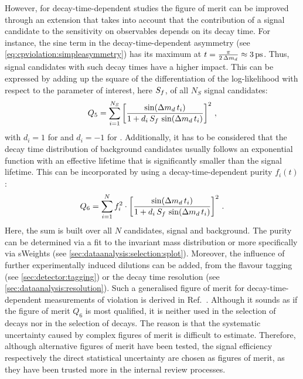 However, for decay-time-dependent studies the figure of merit can be improved
through an extension that takes into account that the contribution of a signal
candidate to the sensitivity on \CP observables depends on its decay time. For
instance, the sine term in the decay-time-dependent asymmetry (see
\cref{eq:cpviolation:simpleasymmetry}) has its maximum at $t =
\frac{\pi}{2\,\dmd} \approx \SI{3}{\ps}$. Thus, signal candidates with such
decay times have a higher impact. This can be expressed by adding up the
square of the differentiation of the log-likelihood with respect to the
parameter of interest, here $S_{f}$, of all $N_S$ signal candidates:
\begin{align}
	Q_5 = \sum_{i=1}^{N_S} \left[\frac{\sin({\Delta m_{{d}}}\,t_i)}{1 + d_i\,S_f\,\sin({\Delta m_{{d}}}\,t_i)}\right]^2\,,
\end{align}
with $d_i = \num{+1}$ for \Bd and $d_i = \num{-1}$ for \Bdb. Additionally, it
has to be considered that the decay time distribution of background candidates
usually follows an exponential function with an effective lifetime that is
significantly smaller than the \Bd signal lifetime. This can be incorporated
by using a decay-time-dependent purity $f_i(t)$:
\begin{align}
	Q_6 = \sum_{i=1}^{N} f_i^2 \cdot \left[\frac{\sin({\Delta m_{{d}}}\,t_i)}{1 + d_i\,S_f\,\sin({\Delta m_{{d}}}\,t_i)}\right]^2\,.
\end{align}
Here, the sum is built over all $N$ candidates, signal and background. The
purity can be determined via a fit to the invariant mass distribution or more
specifically via sWeights (see \cref{sec:dataanalysis:selection:splot}).
Moreover, the influence of further experimentally induced dilutions can be
added, \eg from the flavour tagging (see \cref{sec:detector:tagging})
or the decay time resolution (see \cref{sec:dataanalysis:resolution}). Such a
generalised figure of merit for decay-time-dependent measurements of
\CP violation is derived in Ref.~\cite{FOM}. Although it sounds as if the
figure of merit $Q_6$ is most qualified, it is neither used in the selection
of \BdToJPsiKS decays nor in the selection of \BdToDD decays. The reason is
that the systematic uncertainty caused by complex figures of merit is
difficult to estimate. Therefore, although alternative figures of merit have
been tested, the signal efficiency respectively the direct statistical
uncertainty are chosen as figures of merit, as they have been trusted more in
the internal review processes.
